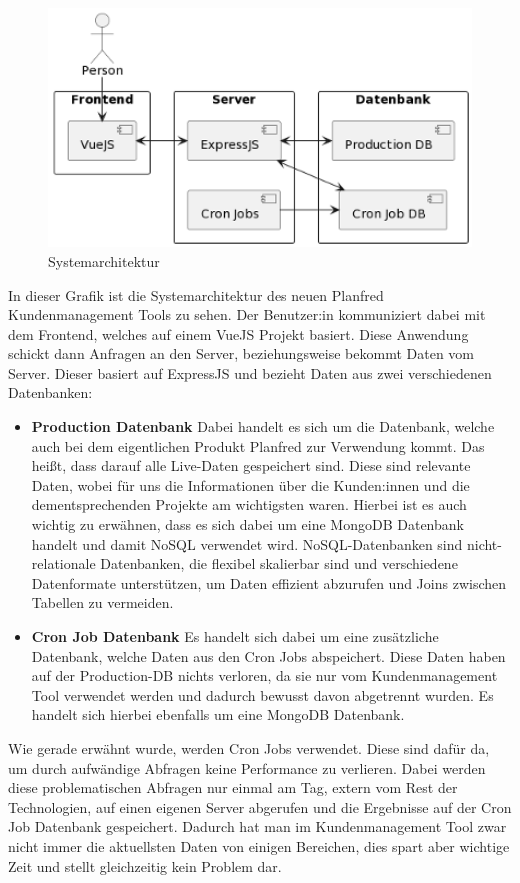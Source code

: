 \begin{figure}[h!]
    \centering
    \includegraphics[width=1\textwidth]{pics/diplomarbeit-architektur.png}
    \caption{Systemarchitektur}
    \label{fig:mesh1}
\end{figure}

In dieser Grafik ist die Systemarchitektur des neuen Planfred Kundenmanagement Tools zu sehen. Der Benutzer:in kommuniziert dabei mit dem Frontend, welches auf einem VueJS Projekt basiert. Diese Anwendung schickt dann Anfragen an den Server, beziehungsweise bekommt Daten vom Server. Dieser basiert auf ExpressJS und bezieht Daten aus zwei verschiedenen Datenbanken:

\begin{itemize}
    \item \textbf{Production Datenbank}
        \newline
        Dabei handelt es sich um die Datenbank, welche auch bei dem eigentlichen Produkt Planfred zur Verwendung kommt. Das heißt, dass darauf alle Live-Daten gespeichert sind. Diese sind relevante Daten, wobei für uns die Informationen über die Kunden:innen und die dementsprechenden Projekte am wichtigsten waren.
        Hierbei ist es auch wichtig zu erwähnen, dass es sich dabei um eine MongoDB Datenbank handelt und damit NoSQL verwendet wird.
        NoSQL-Datenbanken sind nicht-relationale Datenbanken, die flexibel skalierbar sind und verschiedene Datenformate unterstützen, um Daten effizient abzurufen und Joins zwischen Tabellen zu vermeiden.
        \cite{no_sql}
    \item \textbf{Cron Job Datenbank}
        \newline
        Es handelt sich dabei um eine zusätzliche Datenbank, welche Daten aus den Cron Jobs abspeichert. Diese Daten haben auf der Production-DB nichts verloren, da sie nur vom Kundenmanagement Tool verwendet werden und dadurch bewusst davon abgetrennt wurden.
        Es handelt sich hierbei ebenfalls um eine MongoDB Datenbank.
\end{itemize}

Wie gerade erwähnt wurde, werden Cron Jobs verwendet. Diese sind dafür da, um durch aufwändige Abfragen keine Performance zu verlieren. Dabei werden diese problematischen Abfragen nur einmal am Tag, extern vom Rest der Technologien, auf einen eigenen Server abgerufen und die Ergebnisse auf der Cron Job Datenbank gespeichert. Dadurch hat man im Kundenmanagement Tool zwar nicht immer die aktuellsten Daten von einigen Bereichen, dies spart aber wichtige Zeit und stellt gleichzeitig kein Problem dar.
